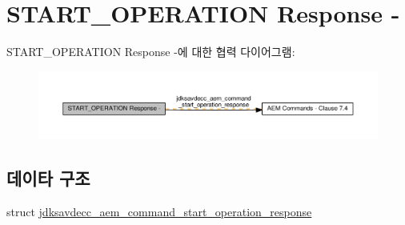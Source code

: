 \hypertarget{group__command__start__operation__response}{}\section{S\+T\+A\+R\+T\+\_\+\+O\+P\+E\+R\+A\+T\+I\+ON Response -\/}
\label{group__command__start__operation__response}
S\+T\+A\+R\+T\+\_\+\+O\+P\+E\+R\+A\+T\+I\+ON Response -\/에 대한 협력 다이어그램\+:
\nopagebreak
\begin{figure}[H]
\begin{center}
\leavevmode
\includegraphics[width=350pt]{group__command__start__operation__response}
\end{center}
\end{figure}
\subsection*{데이타 구조}
\begin{DoxyCompactItemize}
\item 
struct \hyperlink{structjdksavdecc__aem__command__start__operation__response}{jdksavdecc\+\_\+aem\+\_\+command\+\_\+start\+\_\+operation\+\_\+response}
\end{DoxyCompactItemize}
